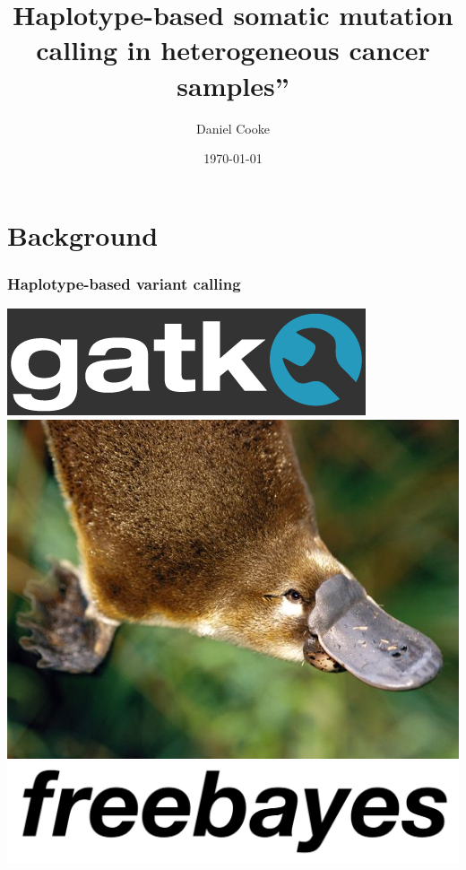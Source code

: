 \documentclass{beamer}
\title[Haplotype-based somatic mutation calling]{Haplotype-based somatic mutation calling in heterogeneous cancer samples”} %
\author[Daniel Cooke]{Daniel Cooke}
\institute[Oxford University] %
{
University of Oxford \\ %
\medskip
\textit{dcooke@well.ox.ac.uk} %
}
\date{\today} %
\begin{document}
\begin{frame}
\titlepage %
\end{frame}


\section{Background}

\begin{frame}
\frametitle{Haplotype-based variant calling}

\begin{center}
    \includegraphics[width=0.3\linewidth]{images/gatk-logo}
    \hfill
    \includegraphics[width=0.3\linewidth]{images/platypus}
    \hfill
    \includegraphics[width=0.3\linewidth]{images/freebayes}
\end{center}

\end{frame}
\end{document}
